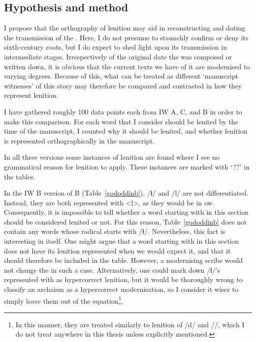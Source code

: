
\subsection{Hypothesis and method}
I propose that the orthography of lenition may aid in reconstructing and dating the transmission of the . Here, I do not presume to staunchly confirm or deny its sixth-century roots, but I do expect to shed light upon its transmission in intermediate stages. Irrespectively of the original date the  was composed or written down, it is obvious that the current texts we have of it are modernised to varying degrees. Because of this, what can be treated as different `manuscript witnesses' of this story may therefore be compared and contrasted in how they represent lenition.

I have gathered roughly 100 data points each from IW A, C, and B in order to make this comparison. For each word that I consider should be lenited by the time of the manuscript, I counted why it should be lenited, and whether lenition is represented orthographically in the manuscript. 

In all three versions some instances of lenition are found where I see no grammatical reason for lenition to apply. These instances are marked with `??' in the tables. 

In the IW B version of  B (Table~\ref{gododdinb}), /ɬ/ and /l/ are not differentiated. Instead, they are both represented with <l>, as they would be in \gls{ow}. Consequently, it is impossible to tell whether a word starting with  in this section should be considered lenited or not. For this reason, Table~\ref{gododdinb} does not contain any words whose radical starts with /ɬ/. Nevertheless, this fact is interesting in itself. One might argue that a word starting with  in this section does not have its lenition represented when we would expect it, and that it should therefore be included in the table. However, a modernising scribe would not change the  in such a case. Alternatively, one could mark down /ɬ/'s represented with  as hypercorrect lenition, but it would be thoroughly wrong to classify an archaism as a hypercorrect modernisation, so I consider it wiser to simply leave them out of the equation\footnote{In this manner, they are treated similarly to lenition of /d/ and /\rh/, which I do not treat anywhere in this thesis unless explicitly mentioned.}. 


